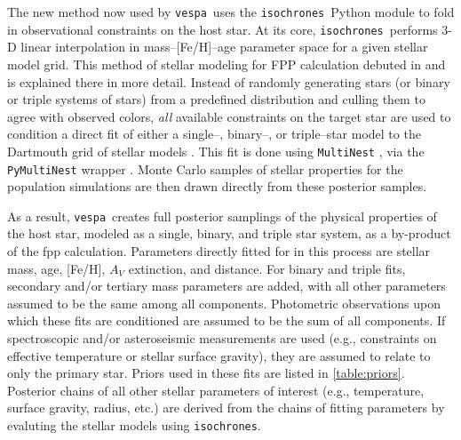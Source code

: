 \documentclass{emulateapj}
\newcommand{\vespa}{\texttt{vespa}}
\newcommand{\isochrones}{\texttt{isochrones}}
\begin{document}
The new method now used by \vespa\ uses the \isochrones\ Python module
\citep{isochrones} to fold in observational constraints on the host
star.  At its core, \isochrones\ performs 3-D linear interpolation in
mass--[Fe/H]--age parameter space for a given stellar model grid.
This method of stellar modeling for FPP calculation debuted in
\citet{Montet:2015} and is explained there in more detail.  Instead of
randomly generating stars (or binary or triple systems of stars) from
a predefined distribution and culling them to agree with observed
colors, \emph{all} available constraints on the target star are used
to condition a direct fit of either a single--, binary--, or
triple--star model to the Dartmouth grid of stellar models
\citep{Dotter:2008, Feiden:2011}.  This fit is done using
\texttt{MultiNest} \citep{Feroz:2009, Feroz:2011, Feroz:2013}, via the
\texttt{PyMultiNest} wrapper \citep{Buchner:2014}.  Monte Carlo
samples of stellar properties for the population simulations are then
drawn directly from these posterior samples.

As a result, \vespa\ creates full posterior samplings of the physical
properties of the host star, modeled as a single, binary, and triple
star system, as a by-product of the \ac{fpp} calculation.  Parameters
directly fitted for in this process are stellar mass, age, [Fe/H],
$A_V$ extinction, and distance.  For binary and triple fits, secondary
and/or tertiary mass parameters are added, with all other parameters
assumed to be the same among all components.  Photometric observations
upon which these fits are conditioned are assumed to be the sum of all
components.  If spectroscopic and/or asteroseismic measurements are
used (e.g., constraints on effective temperature or stellar surface
gravity), they are assumed to relate to only the primary star.  Priors
used in these fits are listed in \autoref{table:priors}.  Posterior
chains of all other stellar parameters of interest (e.g., temperature,
surface gravity, radius, etc.) are derived from the chains of fitting
parameters by evaluting the stellar models using \isochrones.
\end{document}
